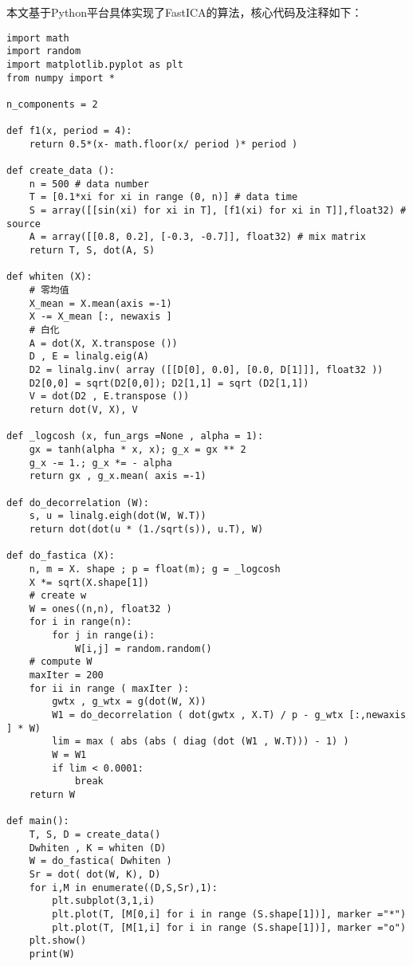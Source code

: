 本文基于Python平台具体实现了FastICA的算法，核心代码及注释如下：

\begin{verbatim}
import math
import random
import matplotlib.pyplot as plt
from numpy import *

n_components = 2

def f1(x, period = 4):
    return 0.5*(x- math.floor(x/ period )* period )

def create_data ():
    n = 500 # data number
    T = [0.1*xi for xi in range (0, n)] # data time
    S = array([[sin(xi) for xi in T], [f1(xi) for xi in T]],float32) # source
    A = array([[0.8, 0.2], [-0.3, -0.7]], float32) # mix matrix
    return T, S, dot(A, S)

def whiten (X):
    # 零均值
    X_mean = X.mean(axis =-1)
    X -= X_mean [:, newaxis ]
    # 白化
    A = dot(X, X.transpose ())
    D , E = linalg.eig(A)
    D2 = linalg.inv( array ([[D[0], 0.0], [0.0, D[1]]], float32 ))
    D2[0,0] = sqrt(D2[0,0]); D2[1,1] = sqrt (D2[1,1])
    V = dot(D2 , E.transpose ())
    return dot(V, X), V

def _logcosh (x, fun_args =None , alpha = 1):
    gx = tanh(alpha * x, x); g_x = gx ** 2
    g_x -= 1.; g_x *= - alpha
    return gx , g_x.mean( axis =-1)

def do_decorrelation (W):
    s, u = linalg.eigh(dot(W, W.T))
    return dot(dot(u * (1./sqrt(s)), u.T), W)

def do_fastica (X):
    n, m = X. shape ; p = float(m); g = _logcosh
    X *= sqrt(X.shape[1])
    # create w
    W = ones((n,n), float32 )
    for i in range(n):
        for j in range(i):
            W[i,j] = random.random()
    # compute W
    maxIter = 200
    for ii in range ( maxIter ):
        gwtx , g_wtx = g(dot(W, X))
        W1 = do_decorrelation ( dot(gwtx , X.T) / p - g_wtx [:,newaxis ] * W)
        lim = max ( abs (abs ( diag (dot (W1 , W.T))) - 1) )
        W = W1
        if lim < 0.0001:
            break
    return W

def main():
    T, S, D = create_data()
    Dwhiten , K = whiten (D)
    W = do_fastica( Dwhiten )
    Sr = dot( dot(W, K), D)
    for i,M in enumerate((D,S,Sr),1):
        plt.subplot(3,1,i)
        plt.plot(T, [M[0,i] for i in range (S.shape[1])], marker ="*")
        plt.plot(T, [M[1,i] for i in range (S.shape[1])], marker ="o")
    plt.show()
    print(W)
\end{verbatim}